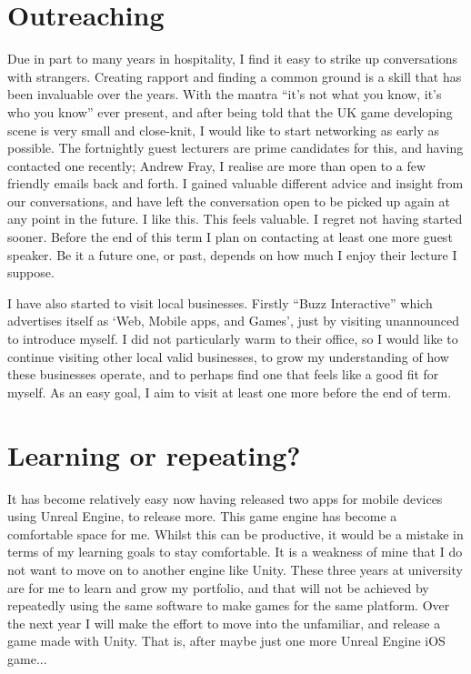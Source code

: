 \documentclass{scrartcl}
\begin{document}
\section*{Outreaching}

Due in part to many years in hospitality, I find it easy to strike up conversations with strangers. Creating rapport and finding a common ground is a skill that has been invaluable over the years. With the mantra ``it's not what you know, it's who you know'' ever present, and after being told that the UK game developing scene is very small and close-knit, I would like to start networking as early as possible. The fortnightly guest lecturers are prime candidates for this, and having contacted one recently; Andrew Fray, I realise are more than open to a few friendly emails back and forth. I gained valuable different advice and insight from our conversations, and have left the conversation open to be picked up again at any point in the future. I like this. This feels valuable. I regret not having started sooner. Before the end of this term I plan on contacting at least one more guest speaker. Be it a future one, or past, depends on how much I enjoy their lecture I suppose.

I have also started to visit local businesses. Firstly ``Buzz Interactive'' which advertises itself as `Web, Mobile apps, and Games', just by visiting unannounced to introduce myself. I did not particularly warm to their office, so I would like to continue visiting other local valid businesses, to grow my understanding of how these businesses operate, and to perhaps find one that feels like a good fit for myself. As an easy goal, I aim to visit at least one more before the end of term.

\section*{Learning or repeating?}

It has become relatively easy now having released two apps for mobile devices using Unreal Engine, to release more. This game engine has become a comfortable space for me. Whilst this can be productive, it would be a mistake in terms of my learning goals to stay comfortable. It is a weakness of mine that I do not want to move on to another engine like Unity. These three years at university are for me to learn and grow my portfolio, and that will not be achieved by repeatedly using the same software to make games for the same platform. Over the next year I will make the effort to move into the unfamiliar, and release a game made with Unity. That is, after maybe just one more Unreal Engine iOS game...
\end{document}

